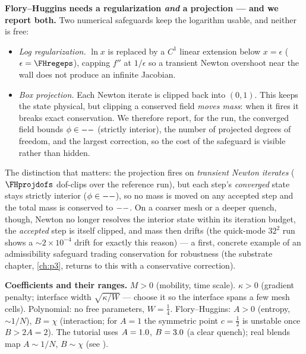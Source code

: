 \begin{keybox}
\textbf{Flory--Huggins needs a regularization \emph{and} a projection ---
and we report both.} Two numerical safeguards keep the logarithm usable,
and neither is free:
\begin{itemize}[nosep]
  \item \emph{Log regularization.} $\ln x$ is replaced by a $C^1$ linear
        extension below $x=\epsilon$ ($\epsilon=\FHregeps$), capping
        $f''$ at $1/\epsilon$ so a transient Newton overshoot near the
        wall does not produce an infinite Jacobian.
  \item \emph{Box projection.} Each Newton iterate is clipped back into
        $(0,1)$. This keeps the state physical, but clipping a conserved
        field \emph{moves mass}: when it fires it breaks exact
        conservation. We therefore report, for the run, the converged
        field bounds $\phi\in--$ (strictly interior), the number
        of projected degrees of freedom, and the largest correction, so
        the cost of the safeguard is visible rather than hidden.
\end{itemize}
The distinction that matters: the projection fires on \emph{transient
Newton iterates} ($\FHprojdofs$ dof-clips over the reference run), but
each step's \emph{converged} state stays strictly interior
($\phi\in--$), so no mass is moved on any accepted step and the
total mass is conserved to $--$. On a coarser mesh or a deeper
quench, though, Newton no longer resolves the interior state within its
iteration budget, the \emph{accepted} step is itself clipped, and mass
then drifts (the quick-mode $32^2$ run shows a
$\sim\!2\times10^{-4}$ drift for exactly this reason) --- a first,
concrete example of an admissibility safeguard trading conservation for
robustness (the substrate chapter, \ref{ch:p3}, returns to this with a
conservative correction).
\end{keybox}

\begin{keybox}
\textbf{Coefficients and their ranges.}
$M>0$ (mobility, time scale). $\kappa>0$ (gradient penalty; interface
width $\sqrt{\kappa/W}$ --- choose it so the interface spans a few mesh
cells). Polynomial: no free parameters, $W=\tfrac14$. Flory--Huggins:
$A>0$ (entropy, $\sim1/N$), $B=\chi$ (interaction; for $A=1$ the
symmetric point $c=\tfrac12$ is unstable once $B>2A=2$). The tutorial
uses $A=1.0$, $B=3.0$ (a clear quench); real blends map $A\sim1/N$,
$B\sim\chi$ (see ).
\end{keybox}

